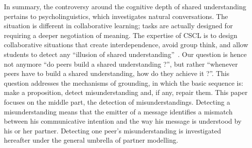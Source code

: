\documentclass[natbib]{svjour3}
\newcommand{\A}{A\xspace}
\newcommand{\B}{B\xspace}
\begin{document}
%
%
%

\vspace{2em}

In summary, the controversy around the cognitive depth of shared understanding
pertains to psycholinguistics, which investigates natural conversations. The
situation is different in collaborative learning; tasks are actually designed
for requiring a deeper negotiation of meaning.  The expertise of CSCL is to design
collaborative situations that create interdependence, avoid group think, and
allow students to detect any ``illusion of shared
understanding''~\citet{cherubini2005grounding}. Our question is hence not
anymore ``do peers build a shared
understanding ?'', but rather ``whenever peers have to build a shared understanding,
how do they achieve it ?''.  This question addresses the mechanisms of grounding, in
which the basic sequence is: make a proposition, detect misunderstanding and, if
any, repair them.  This paper focuses on the middle part, the detection of
misunderstandings.  Detecting a misunderstanding means that the emitter of a
message identifies a mismatch between his communicative intention and the way
his message is understood by his or her partner. Detecting one peer's
misunderstanding is investigated hereafter under the general umbrella of partner
modelling.
\end{document}
